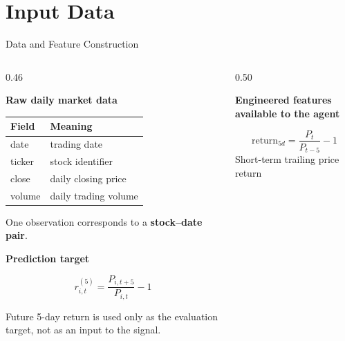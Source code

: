 \documentclass[10pt,aspectratio=169]{beamer}
\begin{document}
\section{Input Data}

\begin{frame}{Data and Feature Construction}

\small

\begin{columns}[T]

\begin{column}{0.46\textwidth}

\textbf{Raw daily market data}

\vspace{0.15cm}

\begin{tabular}{ll}
\toprule
Field & Meaning \\
\midrule
date   & trading date \\
ticker & stock identifier \\
close  & daily closing price \\
volume & daily trading volume \\
\bottomrule
\end{tabular}

\vspace{0.35cm}

One observation corresponds to a
\textbf{stock--date pair}.

\vspace{0.35cm}

\textbf{Prediction target}

\[
r^{(5)}_{i,t}
=
\frac{P_{i,t+5}}{P_{i,t}}-1
\]

{\scriptsize
Future 5-day return is used only as the evaluation target,
not as an input to the signal.
}

\end{column}

\begin{column}{0.50\textwidth}

\textbf{Engineered features available to the agent}

\vspace{0.12cm}

\[
\text{return}_{5d}
=
\frac{P_t}{P_{t-5}}-1
\]
{\scriptsize Short-term trailing price return}

\vspace{0.12cm}


\end{column}
\end{columns}
\end{frame}
\end{document}
